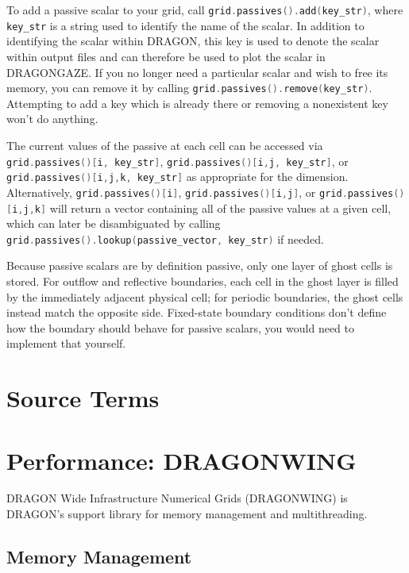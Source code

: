\documentclass[11pt]{report}
\newcommand{\cpp}[1]{\lstinline[language=C++]{#1}}
\begin{document}
To add a passive scalar to your grid, call \cpp{grid.passives().add(key_str)}, where \cpp{key_str} is a string used to identify the name of the scalar. In addition to identifying the scalar within DRAGON, this key is used to denote the scalar within output files and can therefore be used to plot the scalar in DRAGONGAZE. 
If you no longer need a particular scalar and wish to free its memory, you can remove it by calling \cpp{grid.passives().remove(key_str)}. Attempting to add a key which is already there or removing a nonexistent key won't do anything.

The current values of the passive at each cell can be accessed via  \cpp{grid.passives()[i, key_str]}, \cpp{grid.passives()[i,j, key_str]}, or \cpp{grid.passives()[i,j,k, key_str]} as appropriate for the dimension. Alternatively, \cpp{grid.passives()[i]}, \cpp{grid.passives()[i,j]}, or \cpp{grid.passives()[i,j,k]} will return a vector containing all of the passive values at a given cell, which can later be disambiguated by calling \cpp{grid.passives().lookup(passive_vector, key_str)} if needed.

Because passive scalars are by definition passive, only one layer of ghost cells is stored. For outflow and reflective boundaries, each cell in the ghost layer is filled by the immediately adjacent physical cell; for periodic boundaries, the ghost cells instead match the opposite side. 
Fixed-state boundary conditions don't define how the boundary should behave for passive scalars, you would need to implement that yourself.

\chapter{Source Terms} \label{ch:source}




\chapter{Performance: DRAGONWING}
\label{ch:wing}

DRAGON Wide Infrastructure Numerical Grids (DRAGONWING) is DRAGON's support library for memory management and multithreading. 

\section{Memory Management}
\label{sec:wing-memory}
\end{document}
